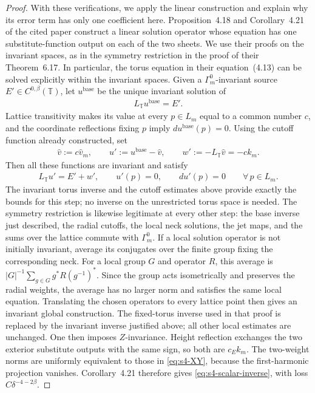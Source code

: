 \documentclass[a4paper,11pt,oneside,reqno]{amsart}
\numberwithin{equation}{section}
\theoremstyle{definition}
\begin{document}
\begin{proof}
    With these verifications, we apply the linear construction
    and explain why its error term has only one coefficient here.
    Proposition~4.18 and Corollary~4.21 of the cited paper
    construct a linear solution operator whose equation has
    one substitute-function output on each of the two sheets.
    We use their proofs on the invariant spaces, as in the
    symmetry restriction in the proof of their Theorem~6.17.
    In particular, the torus equation in their equation~(4.13)
    can be solved explicitly within the invariant spaces.
    Given a $\Gamma_m^0$-invariant source
    $E'\in C^{0,\beta}(\mathbb T)$, let $u^{\mathrm{base}}$
    be the unique invariant solution of
    \begin{align*}
        L_{\mathbb T}u^{\mathrm{base}}=E'.
    \end{align*}
    Lattice transitivity makes its value at every $p\in L_m$
    equal to a common number $c$, and the coordinate reflections
    fixing $p$ imply $du^{\mathrm{base}}(p)=0$.
    Using the cutoff function already constructed, set
    \begin{align*}
        \widehat v:=c\widehat v_m,\qquad
        u':=u^{\mathrm{base}}-\widehat v,\qquad
        w':=-L_{\mathbb T}\widehat v=-c k_m.
    \end{align*}
    Then all these functions are invariant and satisfy
    \begin{align*}
        L_{\mathbb T}u'=E'+w',\qquad
        u'(p)=0,\qquad du'(p)=0
        \qquad\forall\,p\in L_m.
    \end{align*}
    The invariant torus inverse and the cutoff estimates above
    provide exactly the bounds for this step; no inverse on
    the unrestricted torus space is needed.
    The symmetry restriction is likewise legitimate at every
    other step: the base inverse just described,
    the radial cutoffs, the local neck solutions, the jet maps,
    and the sums over the lattice commute with $\Gamma_m^0$.
    If a local solution operator is not initially invariant,
    average its conjugates over the finite group fixing the
    corresponding neck. For a local group $G$ and operator
    $R$, this average is
    $|G|^{-1}\sum_{g\in G}g^*R(g^{-1})^*$.
    Since the group acts isometrically and preserves the
    radial weights, the average has no larger norm and
    satisfies the same local equation. Translating the chosen
    operators to every lattice point then gives an invariant
    global construction. The fixed-torus inverse used in that
    proof is replaced by the invariant inverse justified above;
    all other local estimates are unchanged.
    One then imposes $Z$-invariance. Height reflection exchanges
    the two exterior substitute outputs with the same sign, so
    both are $c_Ek_m$.
    The two-weight norms are uniformly equivalent to those
    in \eqref{eq:s4-XY}, because the first-harmonic projection
    vanishes. Corollary~4.21 therefore gives
    \eqref{eq:s4-scalar-inverse}, with loss
    $C\delta^{-4-2\beta}$.


\end{proof}
\end{document}
